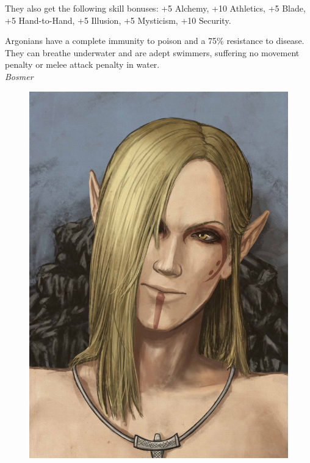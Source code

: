 \documentclass[12pt]{article}
\begin{document}
They also get the following skill bonuses: +5 Alchemy, +10 Athletics, +5 Blade, +5 Hand-to-Hand, +5 Illusion, +5 Mysticism, +10 Security.

Argonians have a complete immunity to poison and a 75\% resistance to disease. They can breathe underwater and are adept swimmers, suffering no movement penalty or melee attack penalty in water.\\

\noindent
\textit{Bosmer}
\begin{figure}
	\includegraphics[width=\textwidth]{Bosmer.png}
\end{figure}
\end{document}
